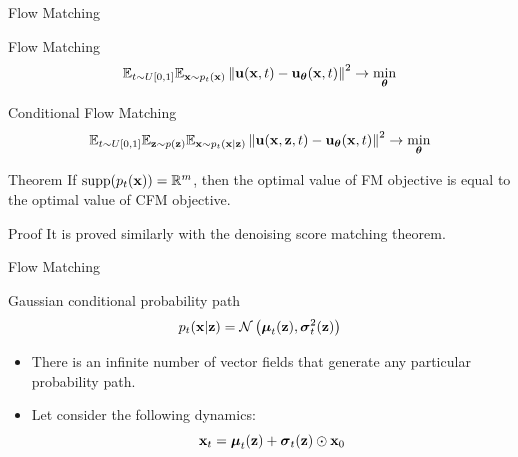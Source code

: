 \begin{frame}{Flow Matching}
	\begin{block}{Flow Matching}
		\vspace{-0.3cm}
		\[
			\mathbb{E}_{t \sim U[0, 1]} \mathbb{E}_{\mathbf{x} \sim p_t(\mathbf{x})}\left\| \mathbf{u}(\mathbf{x}, t) - \mathbf{u}_{\boldsymbol{\theta}}(\mathbf{x}, t) \right\|^2 \rightarrow \min_{\boldsymbol{\theta}}
		\]
		\vspace{-0.3cm}
	\end{block}
	\begin{block}{Conditional Flow Matching}
		\vspace{-0.3cm}
		\[
			\mathbb{E}_{t \sim U[0, 1]} \mathbb{E}_{\mathbf{z} \sim p(\mathbf{z})} \mathbb{E}_{\mathbf{x} \sim p_t(\mathbf{x} | \mathbf{z})}\left\| \mathbf{u}(\mathbf{x}, \mathbf{z}, t) - \mathbf{u}_{\boldsymbol{\theta}}(\mathbf{x}, t) \right\|^2 \rightarrow \min_{\boldsymbol{\theta}}
		\]
		\vspace{-0.3cm}
	\end{block}
	\begin{block}{Theorem}
		If $\text{supp}(p_t(\mathbf{x})) = \mathbb{R}^m$, then the optimal value of FM objective is equal to the optimal value of CFM objective.
	\end{block}
	\begin{block}{Proof}
		It is proved similarly with the denoising score matching theorem.
	\end{block}
\end{frame}
\begin{frame}{Flow Matching}
	\begin{block}{Gaussian conditional probability path}
		\vspace{-0.3cm}
		\[
			p_t(\mathbf{x} | \mathbf{z}) = \mathcal{N}\left(\boldsymbol{\mu}_t(\mathbf{z}), \boldsymbol{\sigma}_t^2(\mathbf{z})\right)
		\]
		\vspace{-0.4cm}
	\end{block}
	\begin{itemize}
		\item There is an infinite number of vector fields that generate any particular probability path.
		\item Let consider the following dynamics:
		\[
			\mathbf{x}_t = \boldsymbol{\mu}_t(\mathbf{z}) + \boldsymbol{\sigma}_t(\mathbf{z}) \odot \mathbf{x}_0
		\]
	\end{itemize}
	
\end{frame}
